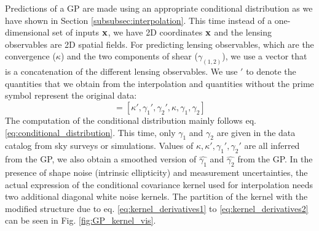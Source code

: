 Predictions of a GP are made using an appropriate conditional distribution as we have
shown in Section \ref{subsubsec:interpolation}. This time instead of a
one-dimensional set of inputs $\mathbf{x}$, we have 2D coordinates $\mathbf{x}$ and the
lensing observables are 2D spatial fields.
For predicting lensing observables, which are the convergence ($\kappa$) and
the two components of shear ($\gamma_{(1, 2)}$), we use a vector that is a concatenation of the
different lensing observables.  
We use $'$ to denote the quantities that we obtain
from the interpolation and quantities without the prime symbol represent the original data: 
\begin{equation}
[\lensparams', \lensparams]  = [\kappa', \gamma_1', \gamma_2', \kappa,
\gamma_1, \gamma_2] 
\end{equation}
The computation of the
conditional distribution mainly follows eq. \ref{eq:conditional_distribution}.
This time, only $\gamma_1$ and $\gamma_2$ are given in the data catalog from sky
surveys or simulations.  Values of
$\kappa, \kappa', \gamma_1', \gamma_2'$ are all inferred from the GP, we also
obtain a smoothed version of $\hat{\gamma_1}$ and $\hat{\gamma_2}$ from the GP.
In the presence of shape noise (intrinsic ellipticity) and measurement uncertainties, the actual 
expression of the conditional covariance kernel used for interpolation  
needs two additional diagonal white noise kernels.  
The partition of the kernel with the modified structure due to eq.
\ref{eq:kernel_derivatives1} to \ref{eq:kernel_derivatives2}
can be seen in Fig. \ref{fig:GP_kernel_vis}.

% 
